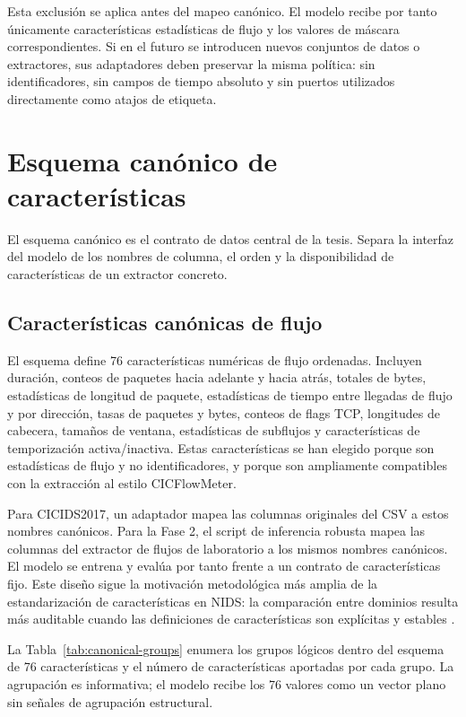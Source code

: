 Esta exclusión se aplica antes del mapeo canónico. El modelo recibe por tanto únicamente características estadísticas de flujo y los valores de máscara correspondientes. Si en el futuro se introducen nuevos conjuntos de datos o extractores, sus adaptadores deben preservar la misma política: sin identificadores, sin campos de tiempo absoluto y sin puertos utilizados directamente como atajos de etiqueta.

\section{Esquema canónico de características}
El esquema canónico es el contrato de datos central de la tesis. Separa la interfaz del modelo de los nombres de columna, el orden y la disponibilidad de características de un extractor concreto.

\subsection{Características canónicas de flujo}
El esquema define 76 características numéricas de flujo ordenadas. Incluyen duración, conteos de paquetes hacia adelante y hacia atrás, totales de bytes, estadísticas de longitud de paquete, estadísticas de tiempo entre llegadas de flujo y por dirección, tasas de paquetes y bytes, conteos de flags TCP, longitudes de cabecera, tamaños de ventana, estadísticas de subflujos y características de temporización activa/inactiva. Estas características se han elegido porque son estadísticas de flujo y no identificadores, y porque son ampliamente compatibles con la extracción al estilo CICFlowMeter.

Para CICIDS2017, un adaptador mapea las columnas originales del CSV a estos nombres canónicos. Para la Fase 2, el script de inferencia robusta mapea las columnas del extractor de flujos de laboratorio a los mismos nombres canónicos. El modelo se entrena y evalúa por tanto frente a un contrato de características fijo. Este diseño sigue la motivación metodológica más amplia de la estandarización de características en NIDS: la comparación entre dominios resulta más auditable cuando las definiciones de características son explícitas y estables \parencite{Sarhan2021}.

La Tabla~\ref{tab:canonical-groups} enumera los grupos lógicos dentro del esquema de 76 características y el número de características aportadas por cada grupo. La agrupación es informativa; el modelo recibe los 76 valores como un vector plano sin señales de agrupación estructural.

